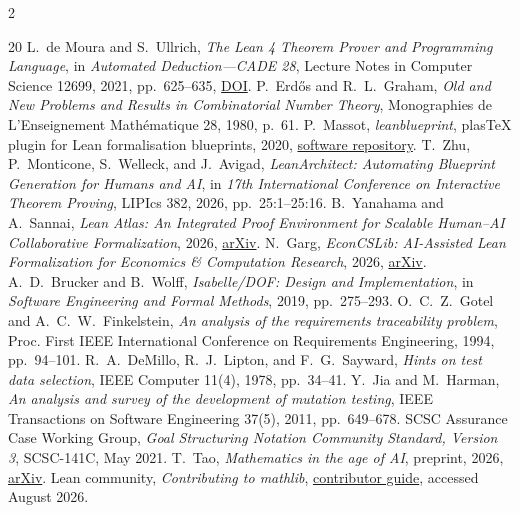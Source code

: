 \documentclass[10pt]{article}
\begin{document}
{\tiny
\begin{multicols}{2}
\begin{thebibliography}{20}
\setlength{\itemsep}{0pt}
\setlength{\parsep}{0pt}
 L.~de Moura and S.~Ullrich, \emph{The Lean 4 Theorem Prover
and Programming Language}, in \emph{Automated Deduction---CADE 28}, Lecture
Notes in Computer Science 12699, 2021, pp.~625--635,
\href{https://doi.org/10.1007/978-3-030-79876-5_37}{DOI}.
 P.~Erd\H{o}s and R.~L.~Graham, \emph{Old and New
Problems and Results in Combinatorial Number Theory}, Monographies de
L'Enseignement Math\'ematique 28, 1980, p.~61.
 P.~Massot, \emph{leanblueprint}, plasTeX plugin for
Lean formalisation blueprints, 2020,
\href{https://github.com/PatrickMassot/leanblueprint}{software repository}.
 T.~Zhu, P.~Monticone, S.~Welleck, and J.~Avigad,
\emph{LeanArchitect: Automating Blueprint Generation for Humans and AI},
in \emph{17th International Conference on Interactive Theorem Proving},
LIPIcs 382, 2026, pp.~25:1--25:16.
 B.~Yanahama and A.~Sannai, \emph{Lean Atlas: An
Integrated Proof Environment for Scalable Human--AI Collaborative
Formalization}, 2026, \href{https://doi.org/10.48550/arXiv.2604.16347}{arXiv}.
 N.~Garg, \emph{EconCSLib: AI-Assisted Lean Formalization for
Economics \& Computation Research}, 2026,
\href{https://doi.org/10.48550/arXiv.2606.13306}{arXiv}.
 A.~D.~Brucker and B.~Wolff, \emph{Isabelle/DOF: Design and
Implementation}, in \emph{Software Engineering and Formal Methods}, 2019,
pp.~275--293.
 O.~C.~Z.~Gotel and A.~C.~W.~Finkelstein, \emph{An analysis
of the requirements traceability problem}, Proc. First IEEE International
Conference on Requirements Engineering, 1994, pp.~94--101.
 R.~A.~DeMillo, R.~J.~Lipton, and F.~G.~Sayward, \emph{Hints
on test data selection}, IEEE Computer 11(4), 1978, pp.~34--41.
 Y.~Jia and M.~Harman, \emph{An analysis and survey of the
development of mutation testing}, IEEE Transactions on Software Engineering
37(5), 2011, pp.~649--678.
 SCSC Assurance Case Working Group, \emph{Goal Structuring
Notation Community Standard, Version 3}, SCSC-141C, May 2021.
 T.~Tao, \emph{Mathematics in the age of AI}, preprint, 2026,
\href{https://doi.org/10.48550/arXiv.2608.16753}{arXiv}.
 Lean community, \emph{Contributing to mathlib},
\href{https://leanprover-community.github.io/contribute/index.html}%
{contributor guide}, accessed August 2026.

\end{thebibliography}
\end{multicols}}
\end{document}
